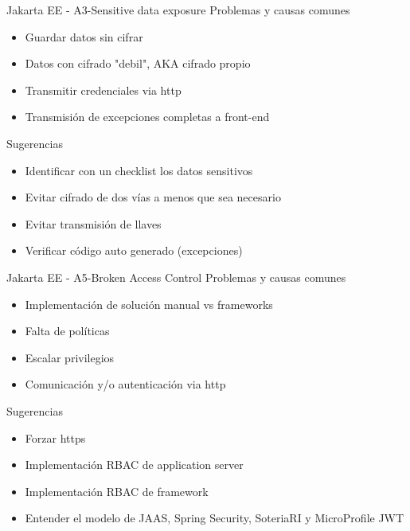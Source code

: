 \documentclass[aspectratio=169]{beamer}
\begin{document}
\begin{frame}{Jakarta EE - A3-Sensitive data exposure}
    Problemas y causas comunes
    \begin{itemize}
        \item Guardar datos sin cifrar
        \item Datos con cifrado "debil", AKA cifrado propio
        \item Transmitir credenciales via http
        \item Transmisión de excepciones completas a front-end
    \end{itemize}

    Sugerencias
    \begin{itemize}
        \item Identificar con un checklist los datos sensitivos
        \item Evitar cifrado de dos vías a menos que sea necesario
        \item Evitar transmisión de llaves
        \item Verificar código auto generado (excepciones)
    \end{itemize}
\end{frame}


\begin{frame}{Jakarta EE - A5-Broken Access Control}
    Problemas y causas comunes
    \begin{itemize}
        \item Implementación de solución manual vs frameworks
        \item Falta de políticas
        \item Escalar privilegios
        \item Comunicación y/o autenticación via http
    \end{itemize}

    Sugerencias
    \begin{itemize}
        \item Forzar https
        \item Implementación RBAC de application server
        \item Implementación RBAC de framework
        \item Entender el modelo de JAAS, Spring Security, SoteriaRI y MicroProfile JWT
    \end{itemize}
\end{frame}
\end{document}

